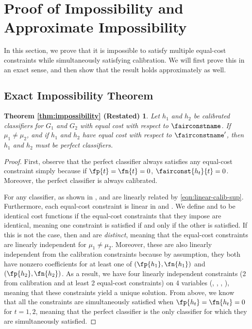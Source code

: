 \section{Proof of Impossibility and Approximate Impossibility}
\label{app:impossiblility}

In this section, we prove that it is impossible to satisfy multiple
equal-cost constraints while simultaneously satisfying calibration.
We will first prove this in an exact sense, and then show that
the result holds approximately as well.

\subsection{Exact Impossibility Theorem}

\newtheorem*{thm:impossibility}{Theorem \ref{thm:impossibility} (Restated)}
\begin{thm:impossibility}
  Let $h_1$ and $h_2$ be calibrated classifiers for $G_1$ and $G_2$ with equal
  cost with respect to
  $\fairconstname$.
  If $\mu_1 \ne \mu_2$, and if $h_1$ and $h_2$ have equal cost with respect to
  $\fairconstname'$, then $h_1$ and $h_2$ must be perfect classifiers.
\end{thm:impossibility}
%
\begin{proof}
  First, observe that the perfect classifier always satisfies any equal-cost
  constraint simply because if $\fp{t} = \fn{t} = 0$,
  $\fairconst{h_t}{t} = 0$. Moreover, the perfect classifier is
  always calibrated.

  For any classifier, as shown in \cite{kleinberg2016inherent},  and
   are linearly related by \eqref{eqn:linear-calib-sup}.
  Furthermore, each equal-cost constraint is linear in  and
  . We define  and
   to be identical cost functions if
  the equal-cost constraints that they impose are identical, meaning one
  constraint is satisfied if and only if the other is satisfied. If this is not
  the case, then  and
   are \emph{distinct},
  meaning that
  the equal-cost constraints are linearly independent for $\mu_1 \ne \mu_2$.
  Moreover, these are also linearly independent from the calibration constraints
  because by assumption, they both have nonzero coefficients for at least one of
  $(\fp{h_1}, \fn{h_1})$ and $(\fp{h_2}, \fn{h_2})$. As a result, we have four linearly
  independent constraints (2 from calibration and at least 2 equal-cost
  constraints) on 4 variables (, , , ), meaning that these
  constraints yield a unique solution. From above, we know that all the
  constraints
  are simultaneously satisfied when $\fp{h_t} = \fn{h_t} = 0$ for $t = 1,2$, meaning
  that the perfect classifier is the only classifier for which they are
  simultaneously satisfied.
\end{proof}

